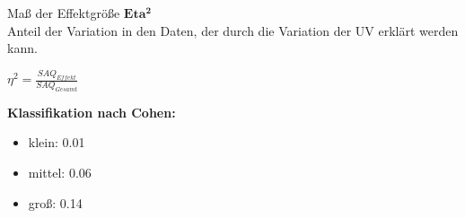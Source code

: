 \documentclass{beamer}
\begin{document}
	\begin{frame}{Maß der Effektgröße}
		$\mathbf{Eta^2}$\\
		Anteil der Variation in den Daten, der durch die Variation der UV erklärt werden kann.\\
		\begin{center}
			$\eta^2 = \frac{SAQ_{Effekt}}{SAQ_{Gesamt}}$ 
		\end{center}
		\textbf{Klassifikation nach Cohen:}
		\begin{itemize}
			\item klein: 0.01
			\item mittel: 0.06
			\item groß: 0.14
		\end{itemize}
		
	\end{frame}
	
\end{document}
